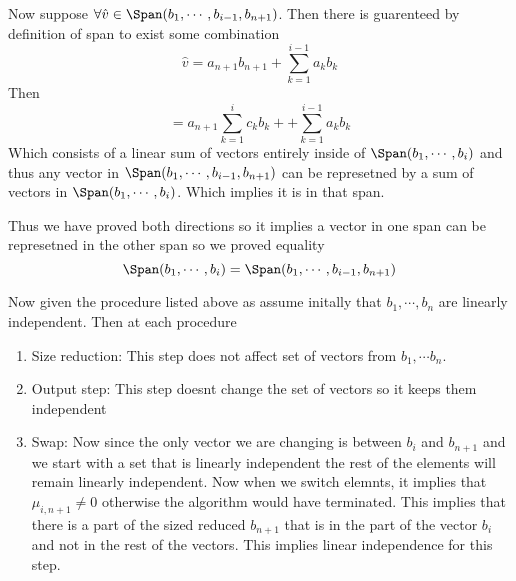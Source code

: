 \documentclass[12pt]{amsart}
\begin{document}
\begin{problem}
\begin{subproblem}
    Now suppose $\forall \hat v\in \Span(b_1,\cdots,b_{i-1},b_{n+1})$. Then there is guarenteed by definition of span to exist some combination 
    \[\hat v = a_{n+1} b_{n+1}+ \sum_{k=1}^{i-1} a_k b_k\]
    Then 
    \[= a_{n+1}\sum_{k=1}^i c_k b_k + + \sum_{k=1}^{i-1} a_k b_k\]
    Which consists of a linear sum of vectors entirely inside of $\Span(b_1,\cdots,b_i)$ and thus any vector in $\Span(b_1,\cdots,b_{i-1},b_{n+1})$ can be represetned by a sum of vectors in $\Span(b_1,\cdots,b_i)$. Which implies it is in that span.

    Thus we have proved both directions so it implies a vector in one span can be represetned in the other span so we proved equality 
    \[\Span(b_1,\cdots,b_i)=\Span(b_1,\cdots,b_{i-1},b_{n+1})\]
    \end{subproblem}
    \begin{subproblem}
      Now given the procedure listed above as assume initally that $b_1,\cdots,b_n$ are linearly independent. Then at each procedure
      \begin{enumerate}
        \item Size reduction: This step does not affect set of vectors from $b_1,\cdots b_n$.
        \item Output step: This step doesnt change the set of vectors so it keeps them independent
        \item Swap: Now since the only vector we are changing is between $b_i$ and $b_{n+1}$ and we start with a set that is linearly independent the rest of the elements will remain linearly independent. Now when we switch elemnts, it implies that $\mu_{i, n+1}\neq 0$ otherwise the algorithm would have terminated. This implies that there is a part of the sized reduced $b_{n+1}$ that is in the part of the vector $b_i$ and not in the rest of the vectors. This implies linear independence for this step.

\end{enumerate}
\end{subproblem}
\end{problem}
\end{document}
